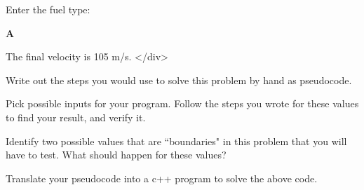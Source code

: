     Enter the fuel type:
    
    \textbf{A}
    
    The final velocity is 105 m/s.
</div>

\newpage

\begin{multipart}
    Write out the steps you would use to solve this problem by hand as pseudocode. 
\end{multipart}

\vspace{10cm}

\begin{multipart}
    Pick possible inputs for your program. Follow the steps you wrote for these values to find your result, and verify it.
\end{multipart}

\vspace{3.5cm}

\begin{multipart}
     Identify two possible values that are ``boundaries" in this problem that you will have to test. What should happen for these values?
\end{multipart}

\vspace{3.5cm}

\begin{multipart}
    Translate your pseudocode into a c++ program to solve the above code.
\end{multipart}


